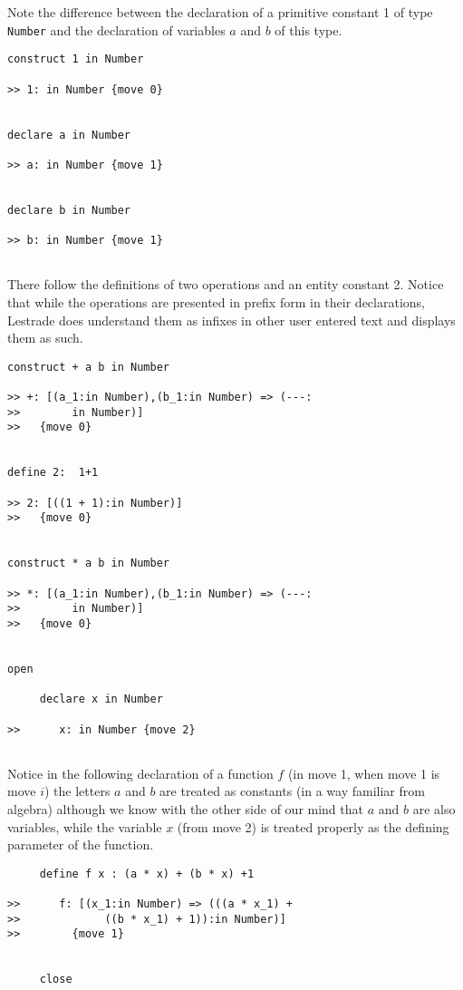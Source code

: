 \documentclass{article}
\begin{document}
Note the difference between the declaration of a primitive constant 1 of type {\tt Number} and the declaration of variables $a$ and $b$ of this type.

\begin{verbatim}
construct 1 in Number

>> 1: in Number {move 0}


declare a in Number

>> a: in Number {move 1}


declare b in Number

>> b: in Number {move 1}


\end{verbatim}

There follow the definitions of two operations and an entity constant 2.  Notice that while
the operations are presented in prefix form in their declarations, Lestrade does understand them
as infixes in other user entered text and displays them as such.

\begin{verbatim}
construct + a b in Number

>> +: [(a_1:in Number),(b_1:in Number) => (---:
>>        in Number)]
>>   {move 0}


define 2:  1+1

>> 2: [((1 + 1):in Number)]
>>   {move 0}


construct * a b in Number

>> *: [(a_1:in Number),(b_1:in Number) => (---:
>>        in Number)]
>>   {move 0}


open

     declare x in Number

>>      x: in Number {move 2}


\end{verbatim}

Notice in the following  declaration of a function $f$ (in move 1, when move 1 is move $i$) the letters $a$ and $b$ are treated as constants (in a way familiar from algebra) although we know with the other side of our mind that $a$ and $b$ are also variables, while the variable $x$ (from move 2) is treated properly as the defining parameter of the function.

\begin{verbatim}
     define f x : (a * x) + (b * x) +1

>>      f: [(x_1:in Number) => (((a * x_1) + 
>>             ((b * x_1) + 1)):in Number)]
>>        {move 1}


     close

\end{verbatim}
\end{document}
